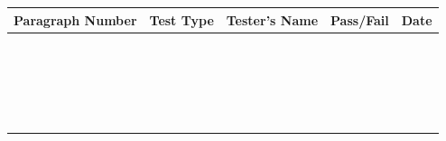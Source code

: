 %

\begin{table}[h]
\centering
\begin{tabular}{|c|c|C{6cm}|c|c|}
\hline
\textbf{Paragraph Number} & \textbf{Test Type}& 
\textbf{Tester's Name} & \textbf{Pass/Fail} & \textbf{Date} \\
\hline
 & & & & \\
\hline
 & & & & \\
\hline
 & & & & \\
\hline
 & & & & \\
\hline
 & & & & \\
\hline
 & & & & \\
\hline
 & & & & \\
\hline
 & & & & \\
\hline
 & & & & \\
\hline
 & & & & \\
\hline
 & & & & \\
\hline
 & & & & \\
\hline
 & & & & \\
\hline
 & & & & \\
\hline
 & & & & \\
\hline
 & & & & \\
\hline
 & & & & \\
\hline
 & & & & \\
\hline
 & & & & \\
\hline
 & & & & \\
\hline
 & & & & \\
\hline
\end{tabular}
\end{table}
%
%
